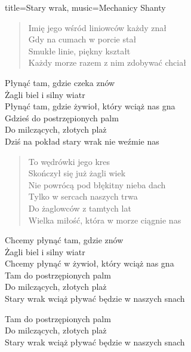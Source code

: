 \begin{song}{title={Stary wrak}, music={Mechanicy Shanty}}
\begin{multicols}{2}
\begin{verse}
        Imię jego wśród liniowców każdy znał \smallskip \\
        Gdy na cumach w porcie stał \\
        Smukłe linie, piękny kształt \\
        Każdy morze razem z nim zdobywać chciał
    \end{verse}
    \begin{chorus}
        Płynąć tam, gdzie czeka znów \\
        Żagli biel i silny wiatr \\
        Płynąć tam, gdzie żywioł, który wciąż nas gna \smallskip \\
        Gdzieś do postrzępionych palm \\
        Do milczących, złotych plaż \\
        Dziś na pokład stary wrak nie weźmie nas
    \end{chorus}
    \begin{verse}
        To wędrówki jego kres \\
        Skończył się już żagli wiek \\
        Nie powrócą pod błękitny nieba dach \smallskip \\
        Tylko w sercach naszych trwa \\
        Do żaglowców z tamtych lat \\
        Wielka miłość, która w morze ciągnie nas
    \end{verse}
    \begin{chorus}
        Chcemy płynąć tam, gdzie znów \\
        Żagli biel i silny wiatr \\
        Chcemy płynąć w żywioł, który wciąż nas gna \smallskip \\
        Tam do postrzępionych palm \\
        Do milczących, złotych plaż \\
        Stary wrak wciąż pływać będzie w naszych snach
    \end{chorus}
    \begin{outro}
        Tam do postrzępionych palm \\
        Do milczących, złotych plaż \\
        Stary wrak wciąż pływać będzie w naszych snach
    \end{outro}
    \end{multicols}
\end{song}

